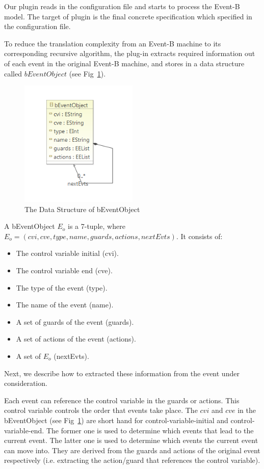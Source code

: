 \documentclass{easychair}
\begin{document}
Our plugin reads in the configuration file and starts to process the Event-B model. The target of plugin is the final concrete specification which specified in the configuration file.

To reduce the translation complexity from an Event-B machine to its corresponding recursive algorithm, the plug-in extracts required information out of each event in the original Event-B machine, and stores in a data structure called $bEventObject$ (see Fig~\ref{fig:ebo}). 

\begin{figure}[!h]
  \centering
    \includegraphics[width=0.5\textwidth]{img/ebo.PNG}
  \caption{The Data Structure of bEventObject}
  \label{fig:ebo}
\end{figure}

A bEventObject $E_o$ is a 7-tuple, where $E_o = (cvi, cve, type, name, guards, actions, nextEvts)$. It consists of:
\begin{itemize}
	\item The control variable initial (cvi).
	\item The control variable end (cve).
	\item The type of the event (type).
	\item The name of the event (name).
	\item A set of guards of the event (guards).
	\item A set of actions of the event (actions).
	\item A set of $E_o$ (nextEvts). 
\end{itemize}
Next, we describe how to extracted these information from the event under consideration.

Each event can reference the control variable in the guards or actions. This control variable controls the order that events take place. The $cvi$ and $cve$ in the bEventObject (see Fig~\ref{fig:ebo}) are short hand for control-variable-initial and control-variable-end. The former one is used to determine which events that lead to the current event. The latter one is used to determine which events the current event can move into. They are derived from the guards and actions of the original event respectively (i.e. extracting the action/guard that references the control variable).
\end{document}
